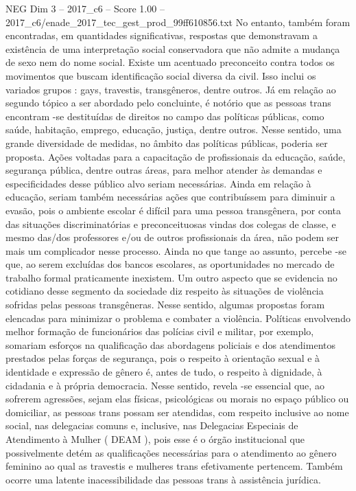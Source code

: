 \begin{textsample}{NEG Dim 3 – 2017\_c6 – Score 1.00 – 2017\_c6/enade\_2017\_tec\_gest\_prod\_99ff610856.txt}
No entanto, também foram encontradas, em quantidades significativas, respostas que demonstravam a existência de uma interpretação social conservadora que não admite a mudança de sexo nem do nome social.
Existe um acentuado preconceito contra todos os movimentos que buscam identificação social diversa da civil.
Isso inclui os variados grupos : gays, travestis, transgêneros, dentre outros.
Já em relação ao segundo tópico a ser abordado pelo concluinte, é notório que as pessoas trans encontram -se destituídas de direitos no campo das políticas públicas, como saúde, habitação, emprego, educação, justiça, dentre outros.
Nesse sentido, uma grande diversidade de medidas, no âmbito das políticas públicas, poderia ser proposta.
Ações voltadas para a capacitação de profissionais da educação, saúde, segurança pública, dentre outras áreas, para melhor atender às demandas e especificidades desse público alvo seriam necessárias.
Ainda em relação à educação, seriam também necessárias ações que contribuíssem para diminuir a evasão, pois o ambiente escolar é difícil para uma pessoa transgênera, por conta das situações discriminatórias e preconceituosas vindas dos colegas de classe, e mesmo das/dos professores e/ou de outros profissionais da área, não podem ser mais um complicador nesse processo.
Ainda no que tange ao assunto, percebe -se que, ao serem excluídas dos bancos escolares, as oportunidades no mercado de trabalho formal praticamente inexistem.
Um outro aspecto que se evidencia no cotidiano desse segmento da sociedade diz respeito às situações de violência sofridas pelas pessoas transgêneras.
Nesse sentido, algumas propostas foram elencadas para minimizar o problema e combater a violência.
Políticas envolvendo melhor formação de funcionários das polícias civil e militar, por exemplo, somariam esforços na qualificação das abordagens policiais e dos atendimentos prestados pelas forças de segurança, pois o respeito à orientação sexual e à identidade e expressão de gênero é, antes de tudo, o respeito à dignidade, à cidadania e à própria democracia.
Nesse sentido, revela -se essencial que, ao sofrerem agressões, sejam elas físicas, psicológicas ou morais no espaço público ou domiciliar, as pessoas trans possam ser atendidas, com respeito inclusive ao nome social, nas delegacias comuns e, inclusive, nas Delegacias Especiais de Atendimento à Mulher ( DEAM ), pois esse é o órgão institucional que possivelmente detém as qualificações necessárias para o atendimento ao gênero feminino ao qual as travestis e mulheres trans efetivamente pertencem.
Também ocorre uma latente inacessibilidade das pessoas trans à assistência jurídica.

\end{textsample}
